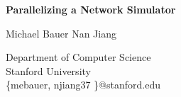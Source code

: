 \documentclass{article}
\begin{document}
\begin{center}
\LARGE{\bf Parallelizing a Network Simulator}

\begin{center}
\Large{
Michael Bauer \hspace{1in} Nan Jiang
}
\end{center}
\Large{Department of Computer Science \\ Stanford University \\ \{mebauer, njiang37 \}@stanford.edu}
\end{center}
\end{document}
